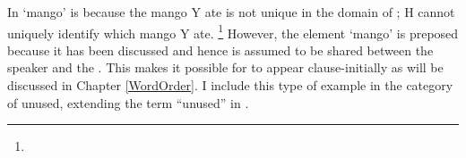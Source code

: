 In \Last `mango' is  because the mango Y ate is not unique in the domain of ; H cannot uniquely identify which mango Y ate.%
 \footnote{
 }
However, the element  `mango' is preposed because it has been discussed and hence is assumed to be shared between the speaker and the .
This makes it possible for  to appear clause-initially as will be discussed in Chapter \ref{WordOrder}.
%
I include this type of example in the category of unused,
extending the term ``unused'' in .

